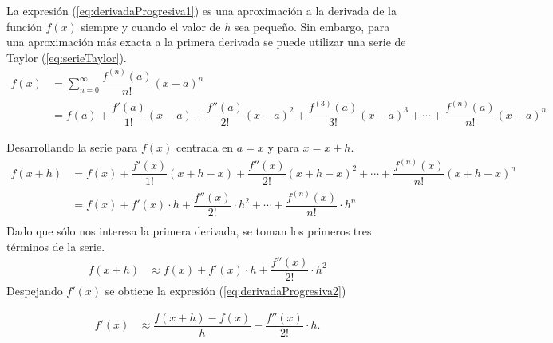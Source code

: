 La expresión (\ref{eq:derivadaProgresiva1}) es una aproximación a la derivada de la función $f(x)$ 
siempre y cuando el valor de $h$ sea pequeño. Sin embargo, para una aproximación más exacta a la primera derivada se puede 
utilizar una serie de Taylor (\ref{eq:serieTaylor}).
\begin{align}
	f(x) &= \sum_{n=0}^\infty \dfrac{f^{(n)}(a)}{n!}(x-a)^n\nonumber\\
		&= f(a) + \dfrac{f'(a)}{1!}(x-a) + \dfrac{f''(a)}{2!}(x-a)^2 + \dfrac{f^{(3)}(a)}{3!}(x-a)^3 + \cdots + \dfrac{f^{(n)}(a)}{n!}(x-a)^n
	\label{eq:serieTaylor}
\end{align}


Desarrollando la serie para $f(x)$ centrada en $a=x$ y para $x=x+h$.
\begin{align*}
	f(x+h) &= f(x) + \dfrac{f'(x)}{1!}(x+h-x) + \dfrac{f''(x)}{2!}(x+h-x)^2 + \cdots + \dfrac{f^{(n)}(x)}{n!}(x+h-x)^n\\
		&= f(x) + f'(x)\cdot h + \dfrac{f''(x)}{2!}\cdot h^2 + \cdots + \dfrac{f^{(n)}(x)}{n!}\cdot h^n\\
\end{align*}
Dado que sólo nos interesa la primera derivada, se toman los primeros tres términos de la serie.
\begin{align*}
	f(x+h) &\approx f(x) + f'(x)\cdot h + \dfrac{f''(x)}{2!}\cdot h^2
\end{align*}
Despejando $f'(x)$ se obtiene la expresión (\ref{eq:derivadaProgresiva2})
\begin{definitionT}
	\begin{align}
		f'(x) &\approx \dfrac{f(x+h)-f(x)}{h} - \dfrac{f''(x)}{2!}\cdot h.
		\label{eq:derivadaProgresiva2}
	\end{align}
\end{definitionT}

